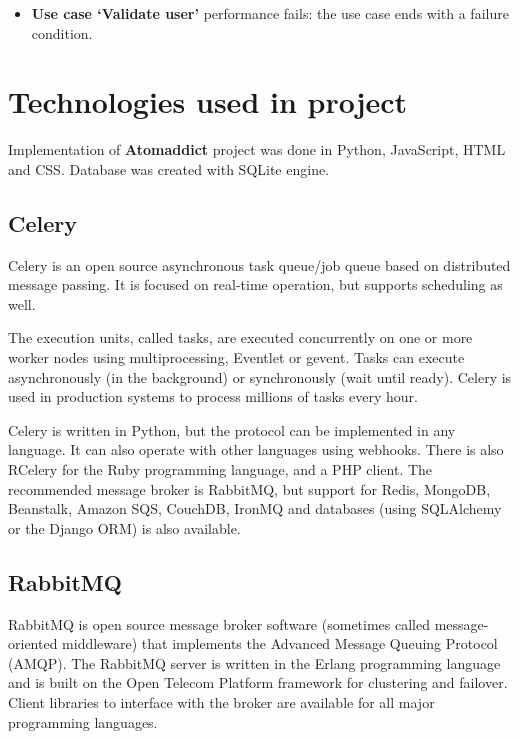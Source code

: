 \documentclass[12pt]{article}
\begin{document}
\begin{itemize}

    \item \textbf{Use case `Validate user'} performance fails: the use case ends with a failure condition.

\end{itemize}

\vspace{0.5cm}

\section{Technologies used in project}
Implementation of \textbf{Atomaddict} project was done in Python, JavaScript, HTML and CSS. Database was created with SQLite engine.

\subsection{Celery}
Celery is an open source asynchronous task queue/job queue based on distributed message passing. It is focused on real-time operation, but supports scheduling as well.

The execution units, called tasks, are executed concurrently on one or more worker nodes using multiprocessing, Eventlet or gevent. Tasks can execute asynchronously (in the background) or synchronously (wait until ready). Celery is used in production systems to process millions of tasks every hour.

Celery is written in Python, but the protocol can be implemented in any language. It can also operate with other languages using webhooks. There is also RCelery for the Ruby programming language, and a PHP client.
The recommended message broker is RabbitMQ, but support for Redis, MongoDB, Beanstalk, Amazon SQS, CouchDB, IronMQ and databases (using SQLAlchemy or the Django ORM) is also available.~\cite{wiki:celery}

\subsection{RabbitMQ}
RabbitMQ is open source message broker software (sometimes called message-oriented middleware) that implements the Advanced Message Queuing Protocol (AMQP). The RabbitMQ server is written in the Erlang programming language and is built on the Open Telecom Platform framework for clustering and failover. Client libraries to interface with the broker are available for all major programming languages.
\end{document}
